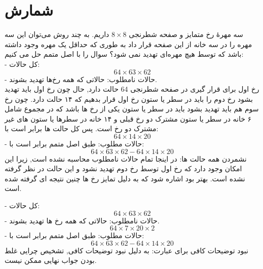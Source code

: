 \documentclass[11pt,largemargins]{h2wp}
\begin{document}
\chapter*{شمارش}


\question
سه مهرۀ رخ متمایز و صفحه شطرنجی $8\times8$ داریم. به چند روش می‌توان این سه مهره را در سه خانه از این صفحه قرار داد به طوری که حداقل یک مهره وجود داشته باشد که توسط هیچ مهره‌ای تهدید نمی شود؟
\solution
  سوال را با اصل متمم حل می کنیم:\\
      -  کل حالات:\\
        \[64\times63\times62\]
      -  حالات نامطلوب: حالاتی که همه رخ‌ها تهدید بشوند.\\
         رخ اول برای قرار گیری در صفحه شطرنجی 64 حالت دارد, حال چون رخ اول باید تهدید بشود رخ دوم را باید در سطر یا ستون رخ اول قرار بدهیم که ۱۴ حالت دارد. چون رخ سوم هم باید تهدید بشود باید در سطر یا ستون یکی از رخ ها باشد که در مجموع شامل ۶ خانه در سطر یا ستون مشترک دو رخ قبلی و ۱۴ خانه در سطرها یا ستون های غیر مشترک دو رخ است. پس کل حالت ها برابر است با:\\
         \[64\times14\times20\]
-         حالات مطلوب: طبق اصل متمم برابر است با:
         \[64\times63\times62 - 64\times14\times20\]
\notes
{}
نشمردن همه حالت ها: در اینجا تمام حالات نامطلوب محاسبه نشده است, زیرا این امکان وجود دارد که رخ اول توسط رخ دوم تهدید نشود و این حالت در نظر گرفته نشده است.
بهتر بود اشاره شود که  به دلیل تمایز رخ ها چنین نتیجه ای گرفته شده است.

\solution
     -  کل حالات:\\
        \[64\times63\times62\]
      -  حالات نامطلوب: حالاتی که همه رخ ها تهدید بشوند.\\
         \[64\times7\times20\times2\]
-         حالات مطلوب: طبق اصل متمم برابر است با:
         \[64\times63\times62 - 64\times14\times20\]
\notes
{}
نبود توضیحات کافی برای عبارت: به دلیل نبود توضیحات کافی, تشخیص چرایی غلط بودن جواب نهایی ممکن نیست.
\end{document}
